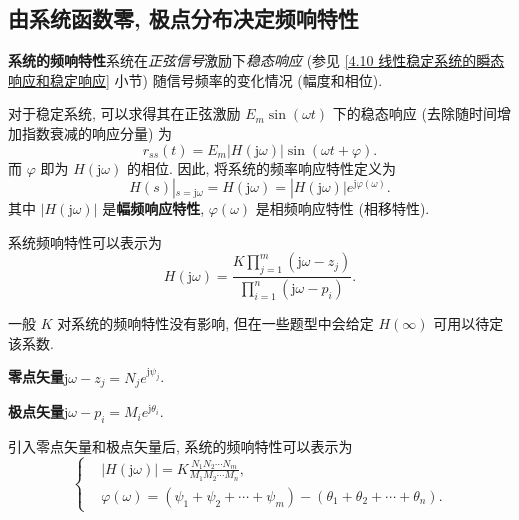 \subsection{由系统函数零, 极点分布决定频响特性} \label{4 由系统函数零, 极点分布决定频响特性}
\textbf{系统的频响特性}\quad 系统在\textit{正弦信号}激励下\textit{稳态响应} (参见 \ref{4.10 线性稳定系统的瞬态响应和稳定响应} 小节) 随信号频率的变化情况 (幅度和相位).

对于稳定系统, 可以求得其在正弦激励 $E_m\sin(\omega t)$ 下的稳态响应 (去除随时间增加指数衰减的响应分量) 为
\begin{equation} \label{eq:4.7 r ss}
    r_{ss}(t)=E_m|H(\mathrm{j}\omega)|\sin(\omega t+\varphi).
\end{equation}
而 $\varphi$ 即为 $H(\mathrm{j}\omega)$ 的相位. 因此, 将系统的频率响应特性定义为
\begin{equation}
    H(s)|_{s=\mathrm{j}\omega}=H(\mathrm{j}\omega)=|H(\mathrm{j}\omega)|e^{\mathrm{j}\varphi(\omega)}.
\end{equation}
其中 $|H(\mathrm{j}\omega)|$ 是\textbf{幅频响应特性}, $\varphi(\omega)$ 是相频响应特性 (相移特性).

系统频响特性可以表示为
\begin{equation} \label{eq:4.7 H j omega}
    H(\mathrm{j}\omega)=\frac{\displaystyle K\prod_{j=1}^{m}(\mathrm{j}\omega-z_j)}{\displaystyle\prod_{i=1}^{n}(\mathrm{j}\omega-p_i)}.
\end{equation}

一般 $K$ 对系统的频响特性没有影响, 但在一些题型中会给定 $H(\infty)$ 可用以待定该系数.

\textbf{零点矢量}\quad $\mathrm{j}\omega-z_j=N_je^{\mathrm{j}\psi_j}$.

\textbf{极点矢量}\quad $\mathrm{j}\omega-p_i=M_ie^{\mathrm{j}\theta_i}$.

引入零点矢量和极点矢量后, 系统的频响特性可以表示为
\begin{equation}
    \left\{\begin{aligned}
         & |H(\mathrm{j}\omega)|=K\frac{N_1N_2\cdots N_m}{M_1M_2\cdots M_n},                  \\
         & \varphi(\omega)=(\psi_1+\psi_2+\cdots+\psi_m)-(\theta_1+\theta_2+\cdots+\theta_n).
    \end{aligned}\right.
\end{equation}
